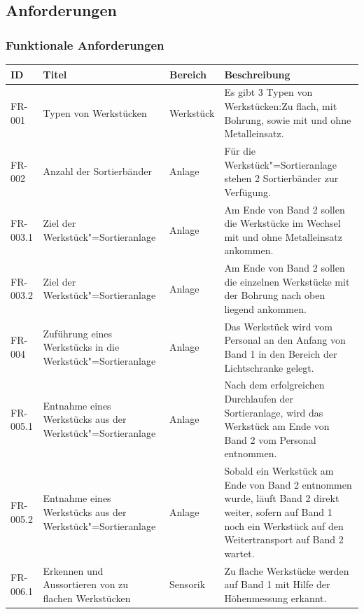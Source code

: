 \documentclass[oneside,a4paper,titlepage]{scrartcl} %
\begin{document}
\newpage

\subsection{Anforderungen}

\subsubsection{Funktionale Anforderungen}
\begin{small}
 \begin{longtable}{|C{2cm}|L{4cm}|C{1.5cm}|L{5.5cm}|}
  \hline
  \textbf{ID} & \textbf{Titel} & \textbf{Bereich} & \textbf{Beschreibung}\\
  \toprule
  \endhead
  \hline
  FR-001 & Typen von Werkstücken & Werkstück & Es gibt 3 Typen von Werkstücken:Zu flach, mit Bohrung, sowie mit und ohne Metalleinsatz.\\
  \hline
   FR-002 & Anzahl der Sortierbänder & Anlage & Für die Werkstück"=Sortieranlage stehen 2 Sortierbänder zur Verfügung.\\
  \hline
  FR-003.1 & Ziel der Werkstück"=Sortieranlage & Anlage & Am Ende von Band 2 sollen die Werkstücke im Wechsel mit und ohne Metalleinsatz ankommen.\\
  \hline
  FR-003.2 & Ziel der Werkstück"=Sortieranlage & Anlage & Am Ende von Band 2 sollen die einzelnen Werkstücke mit der Bohrung nach oben liegend ankommen.\\
  \hline
   FR-004 & Zuführung eines Werkstücks in die Werkstück"=Sortieranlage & Anlage & Das Werkstück wird vom Personal an den Anfang von Band 1 in den Bereich der Lichtschranke gelegt.\\
  \hline
  FR-005.1 & Entnahme eines Werkstücks aus der Werkstück"=Sortieranlage & Anlage & Nach dem erfolgreichen Durchlaufen der Sortieranlage, wird das Werkstück am Ende von Band 2 vom Personal entnommen.\\
  \hline
  FR-005.2 & Entnahme eines Werkstücks aus der Werkstück"=Sortieranlage & Anlage & Sobald ein Werkstück am Ende von Band 2 entnommen wurde, läuft Band 2 direkt weiter, sofern auf Band 1 noch ein Werkstück auf den Weitertransport auf Band 2 wartet.\\
  \hline
   FR-006.1 & Erkennen und Aussortieren von zu flachen Werkstücken & Sensorik & Zu flache Werkstücke werden auf Band 1 mit Hilfe der Höhenmessung erkannt.\\

\end{longtable}
\end{small}
\end{document}
